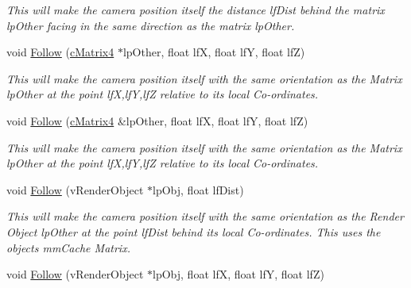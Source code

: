 \begin{DoxyCompactItemize}
\begin{DoxyCompactList}\small\item\em This will make the camera position itself the distance lfDist behind the matrix lpOther facing in the same direction as the matrix lpOther. \end{DoxyCompactList}\item 
\hypertarget{classc_camera_matrix4_ad511368c294014edf99ebbe9dbf53bc2}{
void \hyperlink{classc_camera_matrix4_ad511368c294014edf99ebbe9dbf53bc2}{Follow} (\hyperlink{classc_matrix4}{cMatrix4} $\ast$lpOther, float lfX, float lfY, float lfZ)}
\label{classc_camera_matrix4_ad511368c294014edf99ebbe9dbf53bc2}

\begin{DoxyCompactList}\small\item\em This will make the camera position itself with the same orientation as the Matrix lpOther at the point lfX,lfY,lfZ relative to its local Co-\/ordinates. \end{DoxyCompactList}\item 
\hypertarget{classc_camera_matrix4_a1f0549e1ae97a959863a8fe27bec1169}{
void \hyperlink{classc_camera_matrix4_a1f0549e1ae97a959863a8fe27bec1169}{Follow} (\hyperlink{classc_matrix4}{cMatrix4} \&lpOther, float lfX, float lfY, float lfZ)}
\label{classc_camera_matrix4_a1f0549e1ae97a959863a8fe27bec1169}

\begin{DoxyCompactList}\small\item\em This will make the camera position itself with the same orientation as the Matrix lpOther at the point lfX,lfY,lfZ relative to its local Co-\/ordinates. \end{DoxyCompactList}\item 
\hypertarget{classc_camera_matrix4_a17065b6fdb233d94ad87608a1518d501}{
void \hyperlink{classc_camera_matrix4_a17065b6fdb233d94ad87608a1518d501}{Follow} (vRenderObject $\ast$lpObj, float lfDist)}
\label{classc_camera_matrix4_a17065b6fdb233d94ad87608a1518d501}

\begin{DoxyCompactList}\small\item\em This will make the camera position itself with the same orientation as the Render Object lpOther at the point lfDist behind its local Co-\/ordinates. This uses the objects mmCache Matrix. \end{DoxyCompactList}\item 
\hypertarget{classc_camera_matrix4_a6d2ac844b95f6a23239047a1598880a9}{
void \hyperlink{classc_camera_matrix4_a6d2ac844b95f6a23239047a1598880a9}{Follow} (vRenderObject $\ast$lpObj, float lfX, float lfY, float lfZ)}
\label{classc_camera_matrix4_a6d2ac844b95f6a23239047a1598880a9}


\end{DoxyCompactItemize}
